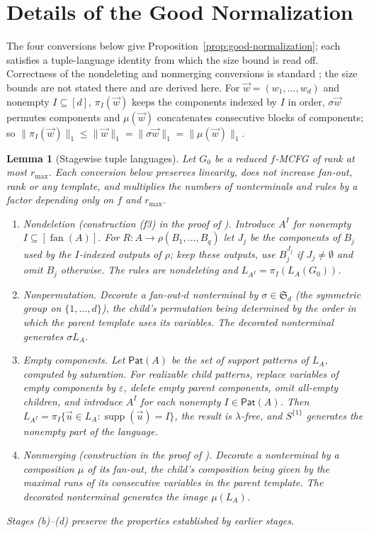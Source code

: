 \documentclass[11pt]{article}
\numberwithin{equation}{section}
\theoremstyle{plain}
\newtheorem{lemma}[theorem]{Lemma}
\theoremstyle{definition}
\theoremstyle{remark}
\newcommand{\tuple}[1]{\vec{#1}}
\newcommand{\eps}{\varepsilon}
\newcommand{\fan}{\operatorname{fan}}
\begin{document}
\section{Details of the Good Normalization}
\label{app:normalization-details}

The four conversions below give Proposition~\ref{prop:good-normalization}; each satisfies
a tuple-language identity from which the size bound is read off.  Correctness of the
nondeleting and nonmerging conversions is standard
\cite{SekiEtAl1991,Kanazawa2019Ogden,Yoshinaka2011}; the size bounds are not stated
there and are derived here.  For
$\tuple w=(w_1,\ldots,w_d)$ and nonempty $I\subseteq[d]$, $\pi_I(\tuple w)$ keeps the
components indexed by $I$ in order, $\sigma\tuple w$ permutes components and
$\mu(\tuple w)$ concatenates consecutive blocks of components; so
$\|\pi_I(\tuple w)\|_1\le\|\tuple w\|_1=\|\sigma\tuple w\|_1=\|\mu(\tuple w)\|_1$.

\begin{lemma}[Stagewise tuple languages]
\label{lem:normalization-stages}
Let $G_0$ be a reduced $f$-MCFG of rank at most $r_{\max}$.  Each conversion below
preserves linearity, does not increase fan-out, rank or any template, and multiplies the
numbers of nonterminals and rules by a factor depending only on $f$ and $r_{\max}$.
\begin{enumerate}[label=\textup{(\alph*)},leftmargin=*]
\item \emph{Nondeletion} (construction (f3) in the proof of
\cite[Lemma~2.2]{SekiEtAl1991}).  Introduce $A^I$ for nonempty $I\subseteq[\fan(A)]$.
For $R:A\to\rho(B_1,\ldots,B_q)$ let $J_j$ be the components of $B_j$ used by the
$I$-indexed outputs of $\rho$; keep these outputs, use $B_j^{J_j}$ if $J_j\ne\emptyset$
and omit $B_j$ otherwise.  The rules are nondeleting and $L_{A^I}=\pi_I(L_A(G_0))$.
\item \emph{Nonpermutation.}  Decorate a fan-out-$d$ nonterminal by
$\sigma\in\mathfrak S_d$ (the symmetric group on $\{1,\ldots,d\}$),
the child's permutation being determined by the order in which
the parent template uses its variables.  The decorated nonterminal generates
$\sigma L_A$.
\item \emph{Empty components.}  Let $\mathsf{Pat}(A)$ be the set of support patterns of
$L_A$, computed by saturation.  For realizable child patterns, replace variables of
empty components by $\eps$, delete empty parent components, omit all-empty children,
and introduce $A^I$ for each nonempty $I\in\mathsf{Pat}(A)$.  Then
$L_{A^I}=\pi_I\{\tuple u\in L_A:\operatorname{supp}(\tuple u)=I\}$, the result is
$\lambda$-free, and $S^{\{1\}}$ generates the nonempty part of the language.
\item \emph{Nonmerging} (construction in the proof of
\cite[Section~2.3, Lemma~1]{Yoshinaka2011}).  Decorate a nonterminal by a composition
$\mu$ of its fan-out, the child's composition being given by the maximal runs of its
consecutive variables in the parent template.  The decorated nonterminal generates the
image $\mu(L_A)$.
\end{enumerate}
Stages (b)--(d) preserve the properties established by earlier stages.
\end{lemma}
\end{document}
